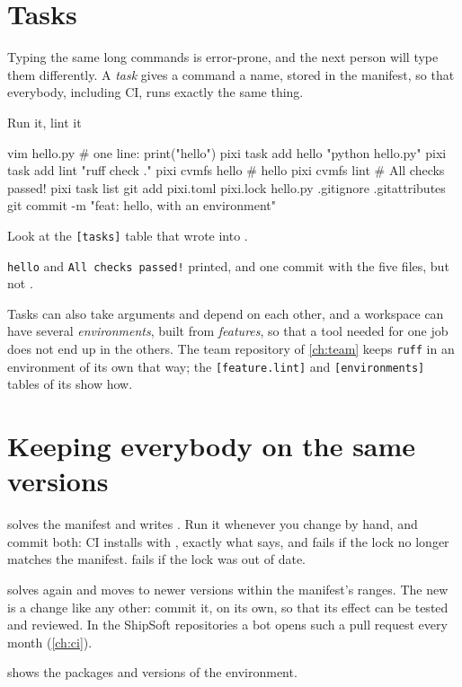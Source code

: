 \section{Tasks}

Typing the same long commands is error-prone, and the next person will type
them differently. A \emph{task} gives a command a name, stored in the
manifest, so that everybody, including CI, runs exactly the same thing.

\begin{exercise}{Run it, lint it}
\label{ex:pixitasks}
\begin{shell}
vim hello.py             # one line: print("hello")
pixi task add hello "python hello.py"
pixi task add lint "ruff check ."
pixi cvmfs hello         # hello
pixi cvmfs lint          # All checks passed!
pixi task list
git add pixi.toml pixi.lock hello.py .gitignore .gitattributes
git commit -m "feat: hello, with an environment"
\end{shell}
Look at the \texttt{[tasks]} table that  wrote into
.
\end{exercise}

\begin{checkpoint}
\texttt{hello} and \texttt{All checks passed!} printed, and one commit with
the five files, but not .
\end{checkpoint}

\begin{note}
Tasks can also take arguments and depend on each other, and a workspace can
have several \emph{environments}, built from \emph{features}, so that a tool
needed for one job does not end up in the others. The team repository of
\cref{ch:team} keeps \texttt{ruff} in an environment of its own that way; the
\texttt{[feature.lint]} and \texttt{[environments]} tables of its
 show how.
\end{note}

\section{Keeping everybody on the same versions}

\begin{description}[style=nextline]
  \item[\cmd{pixi lock}] solves the manifest and writes .
    Run it whenever you change  by hand, and commit both:
    CI installs with , exactly what  says,
    and fails if the lock no longer matches the manifest.
     fails if the lock was out of date.
  \item[\cmd{pixi update -{}-no-install}] solves again and moves to newer versions within
    the manifest's ranges. The new  is a change like any
    other: commit it, on its own, so that its effect can be tested and
    reviewed. In the ShipSoft repositories a bot opens such a pull request
    every month (\cref{ch:ci}).
  \item[\cmd{pixi list}] shows the packages and versions of the environment.
\end{description}


